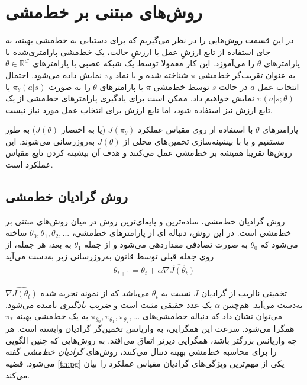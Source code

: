 \section{روش‌های مبتنی بر خط‌مشی}
در این قسمت روش‌هایی را در نظر می‌گیریم که برای دستیابی به خط‌مشی بهینه، به جای استفاده از تابع ارزشِ عمل یا ارزشِ حالت، یک خط‌مشی پارامتری‌شده 
با پارامترهای $\theta$ را می‌آموزد.  این کار  معمولا توسط یک شبکه عصبی با پارامترهای 
$\theta \in \mathbb{R}^{d'}$
 به عنوان تقریب‌گر خط‌مشی 
$\pi$
شناخته شده و با نماد $\pi_\theta$ نمایش داده می‌شود. احتمال انتخاب عمل $a$ در حالت $s$ توسط خط‌مشی $\pi$ با پارامترهای $\theta$ را به صورت
$\pi_\theta(a|s)$
یا
$\pi(a|s;\theta)$
نمایش خواهیم داد.
ممکن است برای یادگیری پارامترهای خط‌مشی از یک تابع ارزش نیز استفاده شود، اما تابع ارزش برای انتخاب عمل مورد نیاز نیست. 

پارامترهای $\theta$ با استفاده از  
روی مقیاس عملکرد  
$J(\pi_\theta)$
(یا به اختصار $J(\theta)$)
به طور مستقیم و یا با بیشینه‌سازی تخمین‌های محلی از  $J(\theta)$ به‌روزرسانی می‌شوند.
این روش‌ها تقریبا همیشه بر خط‌مشی  عمل می‌کنند و 
 هدف آن بیشینه کردن تابع مقیاس عملکرد است. 
 
 
\subsection{روش گرادیان خط‌مشی}
روش گرادیان خط‌مشی، ساده‌ترین و پایه‌ای‌ترین روش در میان روش‌های مبتنی بر خط‌مشی است. در این روش، دنباله‌
ای از پارامترهای خط‌مشی، 
$\theta_0, \theta_1, \theta_2, ...$
ساخته می‌شود که $\theta_0$ به صورت تصادفی مقداردهی می‌شود و از جمله 
$\theta_1$
به بعد، هر جمله، از روی جمله قبلی توسط قانون به‌روزرسانی زیر به‌دست می‌آید
\begin{align}
\theta_{t+1} = \theta_t + \alpha \widehat{\nabla J(\theta_t)}
\label{eq:updatepg}
\end{align}
 
$\widehat{\nabla J(\theta_t)}$
تخمینی نااریب از گرادیان  $J$ نسبت به 
$\theta_t$
 می‌باشد که از نمونه تجربه شده به‌دست می‌آید. هم‌چنین $\alpha$ یک عدد حقیقی مثبت است و 
 \textit{ضریب یادگیری}
 نامیده می‌شود. می‌توان نشان داد که دنباله خط‌مشی‌های
 $\pi_{\theta_0}, \pi_{\theta_1}, \pi_{\theta_2}, ...$
 به یک خط‌مشی بهینه $\pi_*$ همگرا می‌شود. سرعت این همگرایی، به واریانس تخمین‌گر گرادیان وابسته است. هر چه واریانس بزرگتر باشد، همگرایی دیرتر اتفاق می‌افتد. به روش‌هایی که چنین الگویی را برای محاسبه خط‌مشی بهینه دنبال می‌کنند، روش‌های 
\textit{گرادیان خط‌مشی}
 گفته می‌شود. قضیه
\ref{th:pg}
 	یکی از مهم‌ترین ویژگی‌های گرادیان مقیاس عملکرد را بیان می‌کند.

